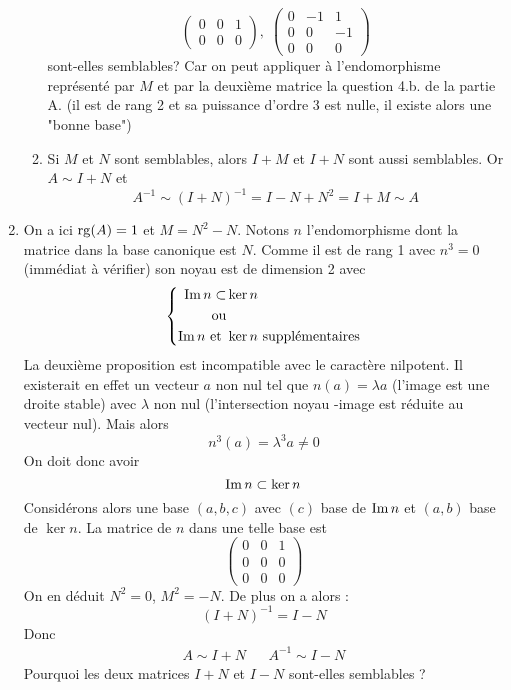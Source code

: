 \begin{enumerate}
\begin{enumerate}
\[\begin{pmatrix}
0 & 0 & 1 \\
0 & 0 & 0
  \end{pmatrix}
,\;
\begin{pmatrix}
0 & -1 & 1 \\
0 & 0 & -1 \\
0 & 0 & 0
  \end{pmatrix}
 \] 
sont-elles semblables?\newline
Car on peut appliquer à l'endomorphisme représenté par $M$ et par la deuxième matrice la question 4.b. de la partie A. (il est de rang 2 et sa puissance d'ordre 3 est nulle, il existe alors une "bonne base")
\item Si $M$ et $N$ sont semblables, alors $I+M$ et $I+N$ sont aussi semblables. Or $A \sim I+N$ et 
\[A^{-1}\sim (I+N)^{-1}=I-N+N^2=I+M \sim A\]
\end{enumerate}
\item On a ici $\operatorname{rg}(A)=1$ et $M=N^{2}-N$. Notons $n$ l'endomorphisme dont la matrice dans la base canonique est $N$. Comme il est de rang 1 avec $n^3=0$ (immédiat à vérifier) son noyau est de dimension 2 avec
\begin{displaymath}
 \left\lbrace 
\begin{aligned}
 \operatorname{Im} n \subset& \ker n \\
\text{ou}& \\
\operatorname{Im} n\text{ et }& \ker n \text{ supplémentaires}
\end{aligned}
\right. 
\end{displaymath}
La deuxième proposition est incompatible avec le caractère nilpotent. Il existerait en effet un vecteur $a$ non nul tel que $n(a)=\lambda a$ (l'image est une droite stable) avec $\lambda$ non nul (l'intersection noyau -image est réduite au vecteur nul). Mais alors 
\begin{displaymath}
 n^3(a)=\lambda ^3 a \neq 0
\end{displaymath}
On doit donc avoir
\[\operatorname{Im} n \subset \ker n\]
Considérons alors une base $(a,b,c)$ avec $(c)$ base de $\operatorname{Im} n$ et $(a,b)$ base de $\ker n$. La matrice de $n$ dans une telle base est
\[
 \begin{pmatrix}
0 & 0 & 1 \\
0 & 0 & 0 \\
0 & 0 & 0
  \end{pmatrix}
\]
On en déduit $N^2=0$, $M^2=-N$. De plus on a alors :
\[(I+N)^{-1}=I-N\]
Donc 
\begin{align*}
 A\sim I+N & & A^{-1}\sim I-N
\end{align*}
Pourquoi les deux matrices $I+N$ et $I-N$ sont-elles semblables ?\newline

\end{enumerate}
